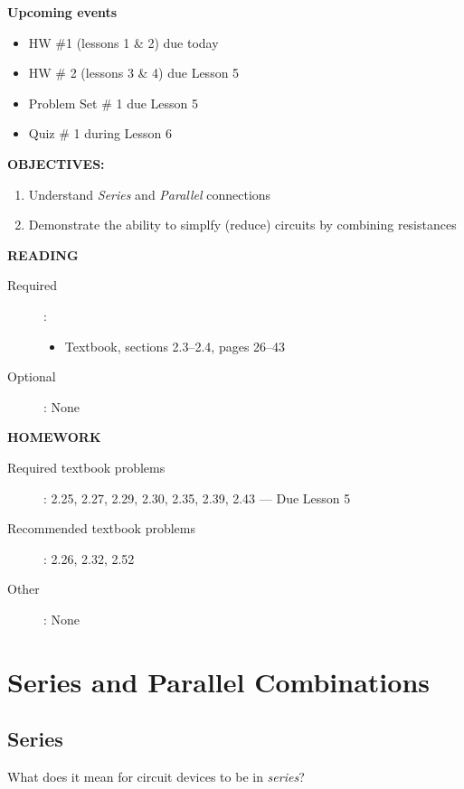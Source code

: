\documentclass{handout}
\begin{document}
\maketitle

\textbf{Upcoming events}
\begin{itemize}
\item HW \#1 (lessons 1 \& 2) due today
\item HW \# 2 (lessons 3 \& 4) due Lesson 5
\item Problem Set \# 1 due Lesson 5
\item Quiz \# 1 during Lesson 6
\end{itemize}

\textbf{OBJECTIVES:}
\begin{enumerate}
\item Understand {\em Series} and {\em Parallel} connections
\item Demonstrate the ability to simplfy (reduce) circuits by combining resistances


\end{enumerate}

\textbf{READING}
\begin{description}
\item [Required]:
\begin{itemize}
\item  Textbook, sections 2.3--2.4, pages 26--43
\end{itemize}
\item [Optional]: None
\end{description}

\textbf{HOMEWORK}
\begin{description}
\item [Required textbook problems]: 2.25, 2.27, 2.29, 2.30, 2.35, 2.39, 2.43 --- Due Lesson 5
\item [Recommended textbook problems]: 2.26, 2.32, 2.52
\item[Other]: None
\end{description}


\section{Series and Parallel Combinations}

\subsection{Series}
What does it mean for circuit devices to be in {\em series}?
\end{document}
